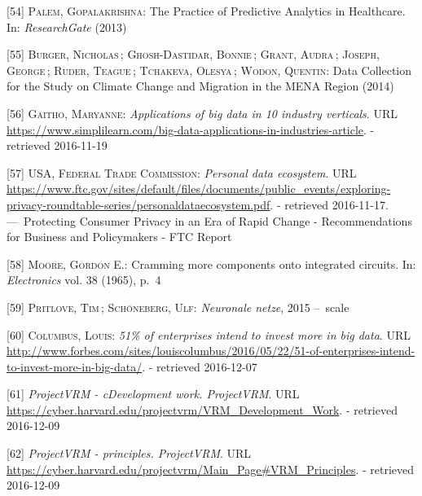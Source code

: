 \documentclass[12pt,english,a4paper,titlepage,cleardoublepage=empty,dottedtoc]{report}
\begin{document}
\hypertarget{ref-the-practice-of-predictive-analytics-in-healthcare_2013}{}
{[}54{]} \textsc{Palem, Gopalakrishna}: The Practice of Predictive
Analytics in Healthcare. In: \emph{ResearchGate} (2013)

\hypertarget{ref-data-collection-for-climate-changes_2014}{}
{[}55{]} \textsc{Burger, Nicholas}\,; \textsc{Ghosh-Dastidar, Bonnie}\,;
\textsc{Grant, Audra}\,; \textsc{Joseph, George}\,; \textsc{Ruder,
Teague}\,; \textsc{Tchakeva, Olesya}\,; \textsc{Wodon, Quentin}: Data
Collection for the Study on Climate Change and Migration in the MENA
Region (2014)

\hypertarget{ref-graphic_2015_applications-of-big-data-in-10-industry-verticals}{}
{[}56{]} \textsc{Gaitho, Maryanne}: \emph{Applications of big data in 10
industry verticals}. URL
\url{https://www.simplilearn.com/big-data-applications-in-industries-article}.
- retrieved 2016-11-19

\hypertarget{ref-graphic_2012_personal-data-ecosystem}{}
{[}57{]} \textsc{USA, Federal Trade Commission}: \emph{Personal data
ecosystem}. URL
\url{https://www.ftc.gov/sites/default/files/documents/public_events/exploring-privacy-roundtable-series/personaldataecosystem.pdf}.
- retrieved 2016-11-17. ---~Protecting Consumer Privacy in an Era of
Rapid Change - Recommendations for Business and Policymakers - FTC
Report

\hypertarget{ref-paper_1965_moors-law}{}
{[}58{]} \textsc{Moore, Gordon E.}: Cramming more components onto
integrated circuits. In: \emph{Electronics} vol. 38 (1965), p.~4

\hypertarget{ref-podcast_2015_cre-neuronale-netze}{}
{[}59{]} \textsc{Pritlove, Tim}\,; \textsc{Schöneberg, Ulf}:
\emph{Neuronale netze}, 2015 --~scale

\hypertarget{ref-web_2016_industries-intention-to-invest-in-big-data}{}
{[}60{]} \textsc{Columbus, Louis}: \emph{51\% of enterprises intend to
invest more in big data}. URL
\url{http://www.forbes.com/sites/louiscolumbus/2016/05/22/51-of-enterprises-intend-to-invest-more-in-big-data/}.
- retrieved 2016-12-07

\hypertarget{ref-web_2016_projectvrm_development-work}{}
{[}61{]} \emph{ProjectVRM - cDevelopment work. ProjectVRM}. URL
\url{https://cyber.harvard.edu/projectvrm/VRM_Development_Work}. -
retrieved 2016-12-09

\hypertarget{ref-web_2016_projectvrm_principles}{}
{[}62{]} \emph{ProjectVRM - principles. ProjectVRM}. URL
\url{https://cyber.harvard.edu/projectvrm/Main_Page\#VRM_Principles}. -
retrieved 2016-12-09
\end{document}
